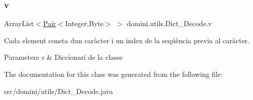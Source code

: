 \subsubsection{\texorpdfstring{v}{v}}
{\footnotesize\ttfamily Array\+List$<$\hyperlink{classdomini_1_1utils_1_1Pair}{Pair}$<$Integer,Byte$>$ $>$ domini.\+utils.\+Dict\+\_\+\+Decode.\+v\hspace{0.3cm}{\ttfamily [package]}}



Cada element consta d\textquotesingle{}un caràcter i un index de la seqüència previa al caràcter. 


\begin{DoxyParams}{Parameters}
{\em v} & Diccionari de la classe \\
\hline
\end{DoxyParams}


The documentation for this class was generated from the following file\+:\begin{DoxyCompactItemize}
\item 
src/domini/utils/Dict\+\_\+\+Decode.\+java\end{DoxyCompactItemize}
